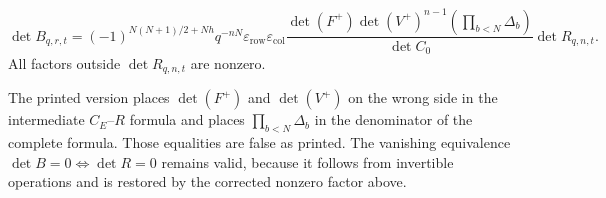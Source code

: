 \begin{theorem}
\[
 \boxed{
 \det B_{q,r,t}=
 (-1)^{N(N+1)/2+Nh}q^{-nN}
 \varepsilon_{\mathrm{row}}\varepsilon_{\mathrm{col}}
 \frac{\det(F^+)\det(V^+)^{n-1}
       \left(\prod_{b<N}\Delta_b\right)}{\det C_0}
 \det R_{q,n,t}.}
\]
All factors outside $\det R_{q,n,t}$ are nonzero.
\end{theorem}

\begin{remark}
The printed version places $\det(F^+)$ and $\det(V^+)$ on the wrong side
in the intermediate $C_E$--$R$ formula and places
$\prod_{b<N}\Delta_b$ in the denominator of the complete formula.
Those equalities are false as printed.  The vanishing equivalence
$\det B=0\Longleftrightarrow\det R=0$ remains valid, because it follows
from invertible operations and is restored by the corrected nonzero
factor above.
\end{remark}
